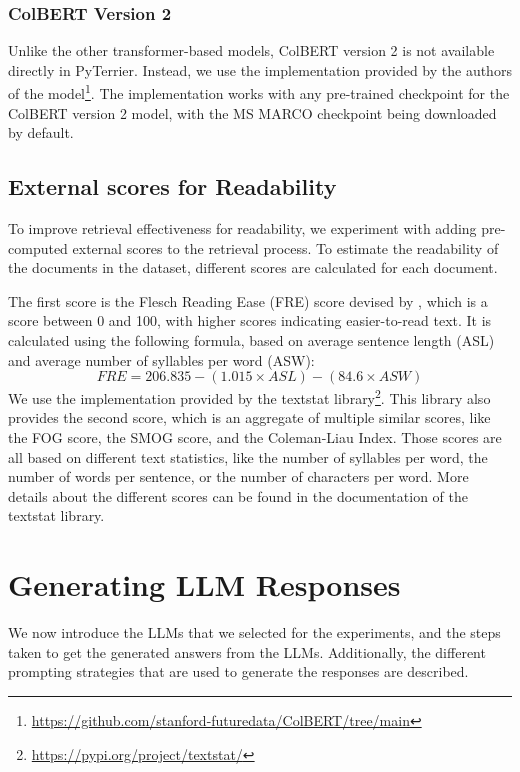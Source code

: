 \subsubsection{ColBERT Version 2}
Unlike the other transformer-based models, ColBERT version 2 is not available directly in PyTerrier.
Instead, we use the implementation provided by the authors of the model\footnote{\url{https://github.com/stanford-futuredata/ColBERT/tree/main}}.
The implementation works with any pre-trained checkpoint for the ColBERT version 2 model, with the MS MARCO checkpoint being downloaded by default.

\subsection{External scores for Readability}\label{sec:external-scores}
To improve retrieval effectiveness for readability, we experiment with adding pre-computed external scores to the retrieval process.
To estimate the readability of the documents in the dataset, different scores are calculated for each document.

The first score is the Flesch Reading Ease (FRE) score devised by \cite{kincaid:1975:Derivation}, which is a score between 0 and 100, with higher scores indicating easier-to-read text.
It is calculated using the following formula, based on average sentence length (ASL) and average number of syllables per word (ASW):
\begin{equation}
    FRE = 206.835 - (1.015 \times ASL) - (84.6 \times ASW)
\end{equation}
We use the implementation provided by the textstat library\footnote{\url{https://pypi.org/project/textstat/}}.
This library also provides the second score, which is an aggregate of multiple similar scores, like the FOG score, the SMOG score, and the Coleman-Liau Index.
Those scores are all based on different text statistics, like the number of syllables per word, the number of words per sentence, or the number of characters per word.
More details about the different scores can be found in the documentation of the textstat library.

\section{Generating LLM Responses}
We now introduce the LLMs that we selected for the experiments, and the steps taken to get the generated answers from the LLMs.
Additionally, the different prompting strategies that are used to generate the responses are described.

